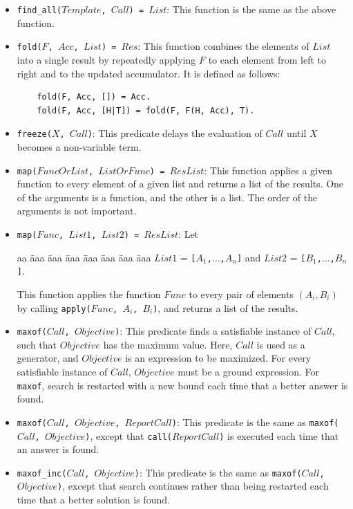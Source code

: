 \begin{itemize}
\item \texttt{find\_all($Template$, $Call$) = $List$}: This function is the same as the above function.
\item \texttt{fold($F$, $Acc$, $List$) = $Res$}: This function combines the elements of $List$ into a single result by repeatedly applying $F$ to each element from left to right and to the updated accumulator. It is defined as follows:
\begin{verbatim}
    fold(F, Acc, []) = Acc.
    fold(F, Acc, [H|T]) = fold(F, F(H, Acc), T).
\end{verbatim}
\item \texttt{freeze($X$, $Call$)}: This predicate delays the evaluation of $Call$ until $X$ becomes a non-variable term.
\item \texttt{map($FuncOrList$, $ListOrFunc$) = $ResList$}: This function applies a given function to every element of a given list and returns a list of the results. One of the arguments is a function, and the other is a list. The order of the arguments is not important. 
\item \texttt{map($Func$, $List1$, $List2$) = $ResList$}: Let
\begin{tabbing}
aa \= aaa \= aaa \= aaa \= aaa \= aaa \= aaa \= aaa \kill
\> $List1$ = \texttt{[$A_1$,$\ldots$,$A_n$]} and $List2$ = \texttt{[$B_1$,$\ldots$,$B_n$]}.
\end{tabbing}
This function applies the function $Func$ to every pair of elements $(A_i, B_i)$ by calling \texttt{apply($Func$, $A_i$, $B_i$)}, and returns a list of the results.
\item \texttt{maxof($Call$, $Objective$)}: This predicate finds a satisfiable instance of $Call$, such that $Objective$ has the maximum value. Here, $Call$ is used as a generator, and $Objective$ is an expression to be maximized. For every satisfiable instance of $Call$, $Objective$ must be a ground expression. For \texttt{maxof}, search is restarted with a new bound each time that a better answer is found.
\item \texttt{maxof($Call$, $Objective$, $ReportCall$)}: This predicate is the same as \texttt{maxof($Call$, \newline $Objective$)}, except that \texttt{call($ReportCall$)} is executed each time that an answer is found.
\item \texttt{maxof\_inc($Call$, $Objective$)}: This predicate is the same as \texttt{maxof($Call$, \newline $Objective$)}, except that search continues rather than being restarted each time that a better solution is found.

\end{itemize}
